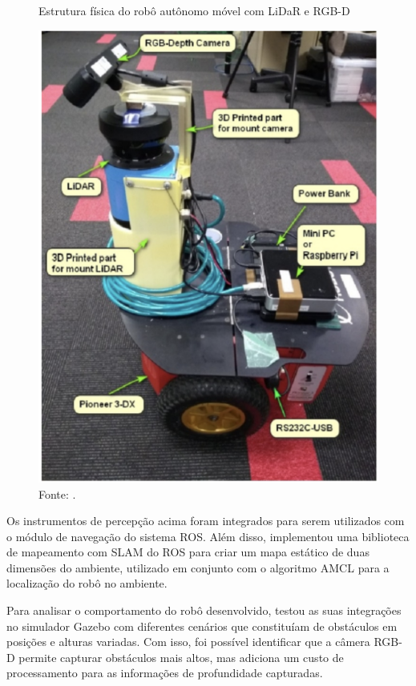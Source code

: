 \begin{figure}[H]
    \centering
    \caption{Estrutura física do robô autônomo móvel com LiDaR e RGB-D}
    \includegraphics[scale=0.45]{lidarRGBD.png}
    \caption*{Fonte: \citet{lidarRGBD}.}
    \label{fig:lidarRGBD}
\end{figure}

Os instrumentos de percepção acima foram integrados para serem utilizados com o módulo de navegação do sistema ROS. Além disso, \citet{lidarRGBD} implementou uma biblioteca de mapeamento com SLAM do ROS para criar um mapa estático de duas dimensões do ambiente, utilizado em conjunto com o algoritmo AMCL para a localização do robô no ambiente. 

Para analisar o comportamento do robô desenvolvido, \citet{lidarRGBD} testou as suas integrações no simulador Gazebo com diferentes cenários que constituíam de obstáculos em posições e alturas variadas. Com isso, foi possível identificar que a câmera RGB-D permite capturar obstáculos mais altos, mas adiciona um custo de processamento para as informações de profundidade capturadas.

